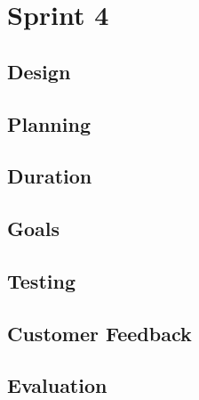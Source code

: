 \chapter{Sprint 4}
\section{Design}
\section{Planning}
\section{Duration}
\section{Goals}
\section{Testing}
\section{Customer Feedback}
\section{Evaluation}